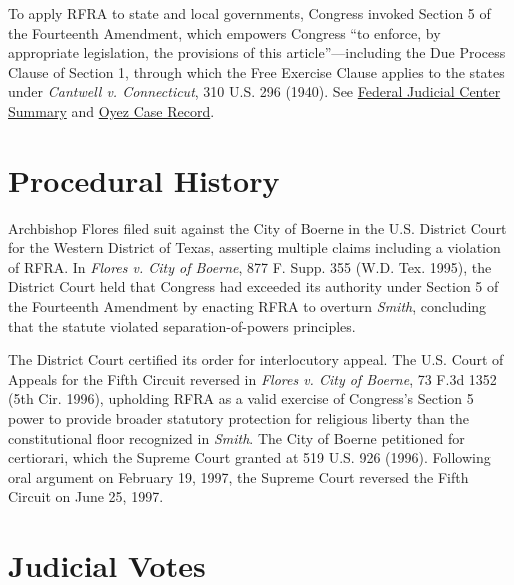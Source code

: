\documentclass[12pt]{article}
\begin{document}
To apply RFRA to state and local governments, Congress invoked Section 5 of the Fourteenth Amendment, which empowers Congress ``to enforce, by appropriate legislation, the provisions of this article''---including the Due Process Clause of Section 1, through which the Free Exercise Clause applies to the states under \textit{Cantwell v. Connecticut}, 310 U.S. 296 (1940). See \href{https://www.fjc.gov/history/cases/cases-that-shaped-the-federal-courts/city-boerne-v-flores}{Federal Judicial Center Summary} and \href{https://www.oyez.org/cases/1996/95-2074}{Oyez Case Record}.

\section{Procedural History}

Archbishop Flores filed suit against the City of Boerne in the U.S. District Court for the Western District of Texas, asserting multiple claims including a violation of RFRA. In \textit{Flores v. City of Boerne}, 877 F. Supp. 355 (W.D. Tex. 1995), the District Court held that Congress had exceeded its authority under Section 5 of the Fourteenth Amendment by enacting RFRA to overturn \textit{Smith}, concluding that the statute violated separation-of-powers principles.

The District Court certified its order for interlocutory appeal. The U.S. Court of Appeals for the Fifth Circuit reversed in \textit{Flores v. City of Boerne}, 73 F.3d 1352 (5th Cir. 1996), upholding RFRA as a valid exercise of Congress's Section 5 power to provide broader statutory protection for religious liberty than the constitutional floor recognized in \textit{Smith}. The City of Boerne petitioned for certiorari, which the Supreme Court granted at 519 U.S. 926 (1996). Following oral argument on February 19, 1997, the Supreme Court reversed the Fifth Circuit on June 25, 1997.

\section{Judicial Votes}
\end{document}
